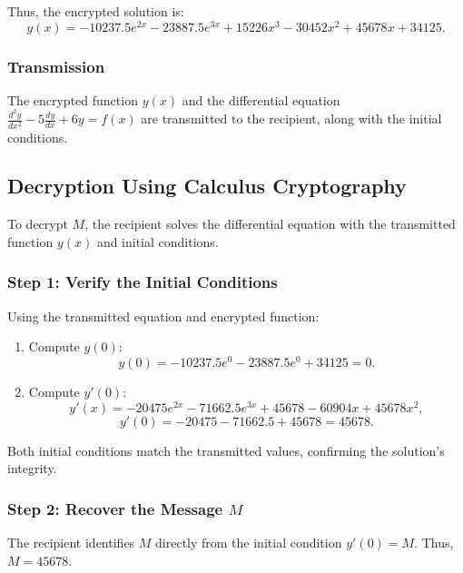 \documentclass[12pt]{article}
\begin{document}
Thus, the encrypted solution is:
\[
y(x) = -10237.5e^{2x} - 23887.5e^{3x} + 15226x^3 - 30452x^2 + 45678x + 34125.
\]

\subsubsection*{Transmission}
The encrypted function \( y(x) \) and the differential equation \( \frac{d^2y}{dx^2} - 5\frac{dy}{dx} + 6y = f(x) \) are transmitted to the recipient, along with the initial conditions.

\subsection*{Decryption Using Calculus Cryptography}

To decrypt \( M \), the recipient solves the differential equation with the transmitted function \( y(x) \) and initial conditions.

\subsubsection*{Step 1: Verify the Initial Conditions}

Using the transmitted equation and encrypted function:
\begin{enumerate}
    \item Compute \( y(0) \):
    \[
    y(0) = -10237.5e^0 - 23887.5e^0 + 34125 = 0.
    \]

    \item Compute \( y'(0) \):
    \[
    y'(x) = -20475e^{2x} - 71662.5e^{3x} + 45678 - 60904x + 45678x^2,
    \]
    \[
    y'(0) = -20475 - 71662.5 + 45678 = 45678.
    \]
\end{enumerate}

Both initial conditions match the transmitted values, confirming the solution's integrity.

\subsubsection*{Step 2: Recover the Message \( M \)}
The recipient identifies \( M \) directly from the initial condition \( y'(0) = M \). Thus, \( M = 45678 \).





\end{document}
